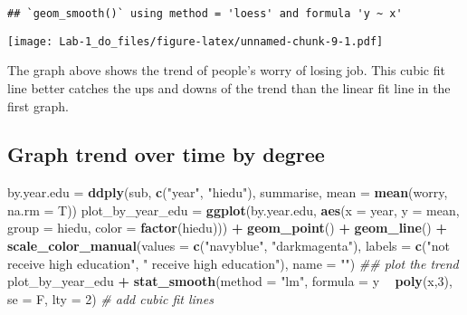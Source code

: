 \documentclass[]{article}
\newenvironment{Shaded}{\begin{snugshade}}{\end{snugshade}}
\newcommand{\CommentTok}[1]{\textcolor[rgb]{0.56,0.35,0.01}{\textit{#1}}}
\newcommand{\DataTypeTok}[1]{\textcolor[rgb]{0.13,0.29,0.53}{#1}}
\newcommand{\DecValTok}[1]{\textcolor[rgb]{0.00,0.00,0.81}{#1}}
\newcommand{\KeywordTok}[1]{\textcolor[rgb]{0.13,0.29,0.53}{\textbf{#1}}}
\newcommand{\NormalTok}[1]{#1}
\newcommand{\OperatorTok}[1]{\textcolor[rgb]{0.81,0.36,0.00}{\textbf{#1}}}
\newcommand{\StringTok}[1]{\textcolor[rgb]{0.31,0.60,0.02}{#1}}
\begin{document}
\begin{verbatim}
## `geom_smooth()` using method = 'loess' and formula 'y ~ x'
\end{verbatim}

\texttt{[image: Lab-1\_do\_files/figure-latex/unnamed-chunk-9-1.pdf]}

The graph above shows the trend of people's worry of losing job. This
cubic fit line better catches the ups and downs of the trend than the
linear fit line in the first graph.

\hypertarget{graph-trend-over-time-by-degree}{%
\subsection{Graph trend over time by
degree}\label{graph-trend-over-time-by-degree}}

\begin{Shaded}
\begin{Highlighting}[]
\NormalTok{by.year.edu =}\StringTok{ }\KeywordTok{ddply}\NormalTok{(sub, }\KeywordTok{c}\NormalTok{(}\StringTok{"year"}\NormalTok{, }\StringTok{"hiedu"}\NormalTok{), summarise, }\DataTypeTok{mean =} \KeywordTok{mean}\NormalTok{(worry, }\DataTypeTok{na.rm =}\NormalTok{ T))}
\NormalTok{plot_by_year_edu =}\StringTok{ }\KeywordTok{ggplot}\NormalTok{(by.year.edu, }\KeywordTok{aes}\NormalTok{(}\DataTypeTok{x =}\NormalTok{ year, }\DataTypeTok{y =}\NormalTok{ mean, }\DataTypeTok{group =}\NormalTok{ hiedu, }\DataTypeTok{color =} \KeywordTok{factor}\NormalTok{(hiedu))) }\OperatorTok{+}\StringTok{ }\KeywordTok{geom_point}\NormalTok{() }\OperatorTok{+}\StringTok{ }\KeywordTok{geom_line}\NormalTok{() }\OperatorTok{+}\StringTok{ }\KeywordTok{scale_color_manual}\NormalTok{(}\DataTypeTok{values =} \KeywordTok{c}\NormalTok{(}\StringTok{"navyblue"}\NormalTok{, }\StringTok{"darkmagenta"}\NormalTok{), }\DataTypeTok{labels =} \KeywordTok{c}\NormalTok{(}\StringTok{"not receive high education"}\NormalTok{, }\StringTok{" receive high education"}\NormalTok{), }\DataTypeTok{name =} \StringTok{""}\NormalTok{) }\CommentTok{## plot the trend}
\NormalTok{plot_by_year_edu }\OperatorTok{+}\StringTok{ }\KeywordTok{stat_smooth}\NormalTok{(}\DataTypeTok{method =} \StringTok{"lm"}\NormalTok{, }\DataTypeTok{formula =}\NormalTok{ y }\OperatorTok{~}\StringTok{ }\KeywordTok{poly}\NormalTok{(x,}\DecValTok{3}\NormalTok{), }\DataTypeTok{se =}\NormalTok{ F, }\DataTypeTok{lty =} \DecValTok{2}\NormalTok{) }\CommentTok{# add cubic fit lines}
\end{Highlighting}
\end{Shaded}
\end{document}
